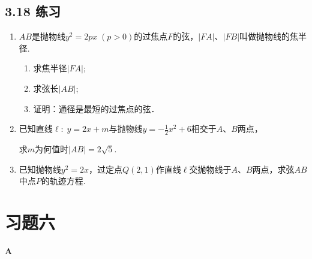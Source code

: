 \subsection*{3.18 练习}
\begin{enumerate}
\item $AB$是抛物线$y^2=2px\; (p>0)$的过焦点$F$的弦，$|FA|$、$|FB|$叫做抛物线的焦半径.
\begin{enumerate}[(1)]
\item 求焦半径$|FA|$;
\item 求弦长$|AB|$;
\item 证明：通径是最短的过焦点的弦．
\end{enumerate}    


\item 已知直线$\ell:\; y=2x+m$与抛物线$y=-\frac{1}{2}x^2+6$相交于$A$、$B$两点，

求$m$为何值时$|AB|=2\sqrt{5}$.
\item 已知抛物线$y^2=2x$，过定点$Q(2,1)$作直线$\ell$交抛物线于$A$、$B$两点，求弦$AB$中点$P$的轨迹方程.
\end{enumerate}

\section*{习题六}
\begin{center}
    \bfseries A
\end{center}

